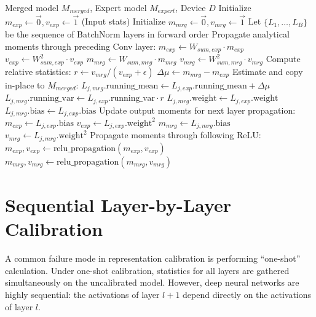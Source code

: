 \documentclass{article}
\theoremstyle{plain}
\theoremstyle{definition}
\theoremstyle{remark}
\begin{document}
\begin{algorithm}[tb]
\caption{Sequential Analytical Calibration}
\label{alg:sequential_aac}
\begin{algorithmic}[1]
 Merged model $M_{merged}$, Expert model $M_{expert}$, Device $D$
\STATE Initialize $m_{exp} \leftarrow \vec{0}, v_{exp} \leftarrow \vec{1}$ (Input stats)
\STATE Initialize $m_{mrg} \leftarrow \vec{0}, v_{mrg} \leftarrow \vec{1}$
\STATE Let $\{L_1, \dots, L_B\}$ be the sequence of BatchNorm layers in forward order
    \STATE Propagate analytical moments through preceding Conv layer:
    \STATE $m_{exp} \leftarrow W_{sum, exp} \cdot m_{exp}$
    \STATE $v_{exp} \leftarrow W^2_{sum, exp} \cdot v_{exp}$
    \STATE $m_{mrg} \leftarrow W_{sum, mrg} \cdot m_{mrg}$
    \STATE $v_{mrg} \leftarrow W^2_{sum, mrg} \cdot v_{mrg}$
    \STATE Compute relative statistics:
    \STATE $r \leftarrow v_{mrg} / (v_{exp} + \epsilon)$
    \STATE $\Delta \mu \leftarrow m_{mrg} - m_{exp}$
    \STATE Estimate and copy in-place to $M_{merged}$:
    \STATE $L_{j, mrg}.\text{running\_mean} \leftarrow L_{j, exp}.\text{running\_mean} + \Delta \mu$
    \STATE $L_{j, mrg}.\text{running\_var} \leftarrow L_{j, exp}.\text{running\_var} \cdot r$
    \STATE $L_{j, mrg}.\text{weight} \leftarrow L_{j, exp}.\text{weight}$
    \STATE $L_{j, mrg}.\text{bias} \leftarrow L_{j, exp}.\text{bias}$
    \STATE Update output moments for next layer propagation:
    \STATE $m_{exp} \leftarrow L_{j, exp}.\text{bias}$
    \STATE $v_{exp} \leftarrow L_{j, exp}.\text{weight}^2$
    \STATE $m_{mrg} \leftarrow L_{j, mrg}.\text{bias}$
    \STATE $v_{mrg} \leftarrow L_{j, mrg}.\text{weight}^2$
    \STATE Propagate moments through following ReLU:
    \STATE $m_{exp}, v_{exp} \leftarrow \text{relu\_propagation}(m_{exp}, v_{exp})$
    \STATE $m_{mrg}, v_{mrg} \leftarrow \text{relu\_propagation}(m_{mrg}, v_{mrg})$
\ENDFOR
\end{algorithmic}
\end{algorithm}

\section{Sequential Layer-by-Layer Calibration}
\label{sec:sequential}

A common failure mode in representation calibration is performing ``one-shot'' calculation. Under one-shot calibration, statistics for all layers are gathered simultaneously on the uncalibrated model. However, deep neural networks are highly sequential: the activations of layer $l+1$ depend directly on the activations of layer $l$.
\end{document}
